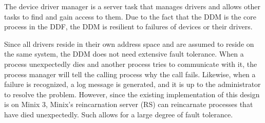 
The device driver manager is a server task that manages
drivers and allows other tasks to find and gain access to them.
Due to the fact that the DDM is the core process in the DDF, the DDM is
resilient to failures of devices or their drivers.

Since all drivers reside in their own address space and are assumed to
reside on the same system, the DDM does not need extensive fault tolerance.
When a process unexpectedly dies and another process tries to communicate
with it, the process manager will tell the calling process why the call
fails.  Likewise, when a failure is recognized, a log message is generated,
and it is up to the administrator to resolve the problem.  However, since
the existing implementation of this design is on Minix 3, Minix's
reincarnation server (RS) can reincarnate processes that have died
unexpectedly. Such allows for a large degree of fault tolerance.
